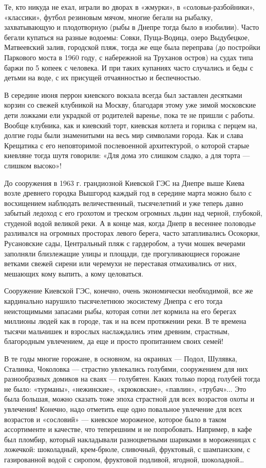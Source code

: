 Те, кто никуда не ехал, играли во дворах в «жмурки», в «соловьи-разбойники»,
«классики», футбол резиновым мячом, многие бегали на рыбалку, захватывающую и
плодотворную (рыбы в Днепре тогда было в изобилии). Часто бегали купаться на
разные водоемы: Совки, Пуща-Водица, озеро Выдубецкое, Матвеевский залив,
городской пляж, тогда же еще была переправа (до постройки Паркового моста в
1960 году, с набережной на Труханов остров) на судах типа баржи по 5 копеек с
человека. И при таких купаниях часто случались и беды с детьми на воде, с их
присущей отчаянностью и беспечностью. 

В середине июня перрон киевского вокзала всегда был заставлен десятками корзин
со свежей клубникой на Москву, благодаря этому уже зимой московские дети
ложками ели украдкой от родителей варенье, пока те не пришли с работы. Вообще
клубника, как и киевский торт, киевская котлета и горилка с перцем на, долгие
годы были знаменитыми на весь мир символами города. Как и слава Крещатика с его
неповторимой послевоенной архитектурой, о которой старые киевляне тогда шутя
говорили: «Для дома это слишком сладко, а для торта --- слишком высоко»! 

До сооружения в 1963 г. грандиозной Киевской ГЭС на Днепре выше Киева возле
древнего городка Вышгород каждый год в середине марта можно было с восхищением
наблюдать величественный, тысячелетний и уже теперь давно забытый ледоход с его
грохотом и треском огромных льдин над черной, глубокой, студеной водой великой
реки. А в конце мая, когда Днепр в весеннее половодье разливался на огромных
просторах левого берега, часто затапливались Осокорки, Русановские сады,
Центральный пляж с гардеробом, а тучи мошек вечерами заполняли близлежащие
улицы и площади, где прогуливающиеся горожане ветками свежей сирени или
черемухи не переставая отмахивались от них, мешающих кому выпить, а кому
целоваться.

Сооружение Киевской ГЭС, конечно, очень экономически необходимой, все же
кардинально нарушило тысячелетнюю экосистему Днепра с его тогда неистощимыми
запасами рыбы, которая сотни лет кормила на его берегах миллионы людей как в
городе, так и на всем протяжении реки. В те времена тысячи мальчишек и взрослых
наслаждались этим древним, страстным, благородным увлечением, да еще и просто
пропитанием своих семей!

В те годы многие горожане, в основном, на окраинах --- Подол, Шулявка, Сталинка,
Чоколовка --- страстно увлекались голубями, сооружением для них разнообразных
домиков на сваях --- голубятен. Каких только пород голубей тогда не было:
«турманы», «нежинские», «крюковские», «павлин», «трубач»... Это была большая,
можно сказать тоже эпоха страстной для всех возрастов охоты и увлечения!
Конечно, надо отметить еще одно повальное увлечение для всех возрастов и
«сословий» --- киевское мороженое, которое было в таком ассортименте и качестве,
что теперешним и не попробовать. Например, в кафе был пломбир, который
накладывали разноцветными шариками в мороженицах с ложечкой: шоколадный,
крем-брюле, сливочный, фруктовый, с шампанским, с газированной водой с сиропом,
фруктовой подливой, ягодной, шоколадной… 

